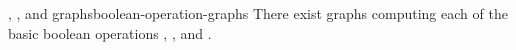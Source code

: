 %

%
%

\begin{lemma}{\NOT, \OR, and \AND{} graphs}{boolean-operation-graphs}%
  There exist graphs computing each of the basic boolean operations \NOT, \OR,
  and \AND.
\end{lemma}


